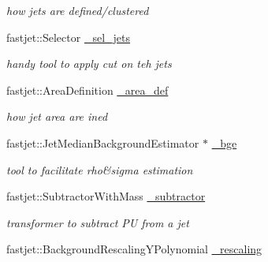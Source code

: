 \begin{CompactItemize}
\begin{CompactList}\small\item\em how jets are defined/clustered \item\end{CompactList}\item 
\hypertarget{classTestFilterAnalysis_9758bb18f5fc5788c15b17fabc7506ad}{
fastjet::Selector \hyperlink{classTestFilterAnalysis_9758bb18f5fc5788c15b17fabc7506ad}{\_\-sel\_\-jets}}
\label{classTestFilterAnalysis_9758bb18f5fc5788c15b17fabc7506ad}

\begin{CompactList}\small\item\em handy tool to apply cut on teh jets \item\end{CompactList}\item 
\hypertarget{classTestFilterAnalysis_2ccd4b28a27db35219278571fd4a2f2b}{
fastjet::Area\-Definition \hyperlink{classTestFilterAnalysis_2ccd4b28a27db35219278571fd4a2f2b}{\_\-area\_\-def}}
\label{classTestFilterAnalysis_2ccd4b28a27db35219278571fd4a2f2b}

\begin{CompactList}\small\item\em how jet area are ined \item\end{CompactList}\item 
\hypertarget{classTestFilterAnalysis_9d6408d3978407cf7421e9b8118e24b2}{
fastjet::Jet\-Median\-Background\-Estimator $\ast$ \hyperlink{classTestFilterAnalysis_9d6408d3978407cf7421e9b8118e24b2}{\_\-bge}}
\label{classTestFilterAnalysis_9d6408d3978407cf7421e9b8118e24b2}

\begin{CompactList}\small\item\em tool to facilitate rho\&sigma estimation \item\end{CompactList}\item 
\hypertarget{classTestFilterAnalysis_c8cffcbdc1f65601a79c5cd0fcd0d742}{
fastjet::Subtractor\-With\-Mass \hyperlink{classTestFilterAnalysis_c8cffcbdc1f65601a79c5cd0fcd0d742}{\_\-subtractor}}
\label{classTestFilterAnalysis_c8cffcbdc1f65601a79c5cd0fcd0d742}

\begin{CompactList}\small\item\em transformer to subtract PU from a jet \item\end{CompactList}\item 
\hypertarget{classTestFilterAnalysis_30e0392e5bf394067394d5b01baf39d9}{
fastjet::Background\-Rescaling\-YPolynomial \hyperlink{classTestFilterAnalysis_30e0392e5bf394067394d5b01baf39d9}{\_\-rescaling}}
\label{classTestFilterAnalysis_30e0392e5bf394067394d5b01baf39d9}


\end{CompactItemize}
